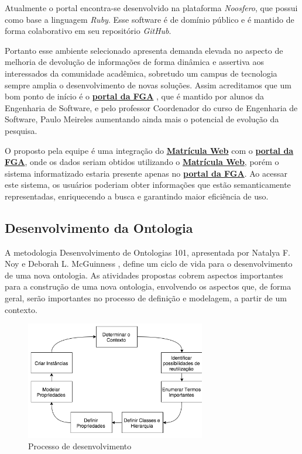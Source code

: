 	Atualmente o portal encontra-se desenvolvido na plataforma \textit{Noosfero}, que possui como base a linguagem \textit{Ruby}. Esse software é de domínio público e é mantido de forma colaborativo em seu repositório \textit{GitHub}.

	Portanto esse ambiente selecionado apresenta demanda elevada no aspecto de melhoria de devolução de informações de forma dinâmica e assertiva aos interessados da comunidade acadêmica, sobretudo um campus de tecnologia sempre amplia o desenvolvimento de novas soluções. Assim acreditamos que um bom ponto de início é o \href{https://fga.unb.br/}{\textbf{portal da FGA}} , que é mantido por alunos da Engenharia de Software, e pelo professor Coordenador do curso de Engenharia de Software, Paulo Meireles aumentando ainda mais o potencial de evolução da pesquisa.

	O proposto pela equipe é uma integração do \href{http://matriculaweb.unb.br}{\textbf{Matrícula Web}} com o \href{https://fga.unb.br/}{\textbf{portal da FGA}}, onde os dados seriam obtidos utilizando o \href{http://matriculaweb.unb.br}{\textbf{Matrícula Web}}, porém o sistema informatizado estaria presente apenas no \href{https://fga.unb.br/}{\textbf{portal da FGA}}. Ao acessar este sistema, os usuários poderiam obter informações que estão semanticamente representadas, enriquecendo a busca e garantindo maior eficiência de uso.


\subsection{Desenvolvimento da Ontologia}

A metodologia Desenvolvimento de Ontologias 101, apresentada por Natalya F. Noy e Deborah L. McGuinness \cite{noy2001ontology}, define um ciclo de vida para o desenvolvimento de uma nova ontologia. As atividades propostas cobrem aspectos importantes para a construção de uma nova ontologia, envolvendo os aspectos que, de forma geral, serão importantes no processo de definição e modelagem, a partir de um contexto.

\begin{figure}[H]
	\centering
	\includegraphics[width=0.7\textwidth]{imagens/desenvolvimento}
	\caption{Processo de desenvolvimento}
	\label{img:desenvolvimento}
\end{figure}

